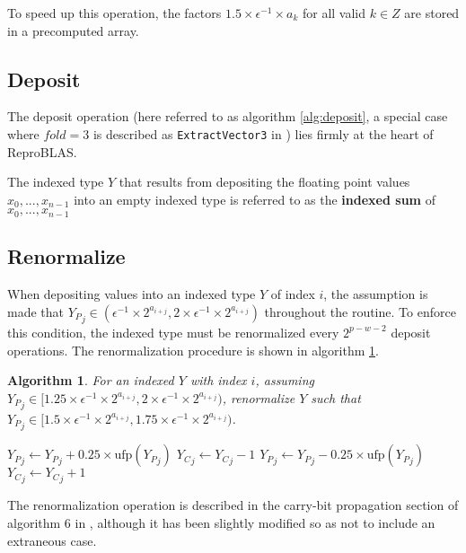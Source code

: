 \documentclass[12pt]{article}
\providecommand{\ufp}{\ensuremath{\text{ufp}}}
\theoremstyle{plain}
\newtheorem{alg}{Algorithm}[section]
\begin{document}
    To speed up this operation, the factors $1.5 \times \epsilon^{-1} \times a_k$ for all valid $k \in Z$ are stored in a precomputed array.

  \subsection{Deposit}
    The deposit operation (here referred to as algorithm \ref{alg:deposit}, a special case where $fold = 3$ is described as \verb|ExtractVector3| in \cite{repsum}) lies firmly at the heart of ReproBLAS.

    The indexed type $Y$ that results from depositing the floating point values $x_0, ..., x_{n - 1}$ into an empty indexed type is referred to as the \textbf{indexed sum} of $x_0, ..., x_{n - 1}$

  \subsection{Renormalize}
    When depositing values into an indexed type $Y$ of index $i$, the assumption is made that ${Y_P}_j \in (\epsilon^{-1}\times 2^{a_{i + j}}, 2 \times \epsilon^{-1}\times 2^{a_{i + j}})$ throughout the routine. To enforce this condition, the indexed type must be renormalized every $2^{p - w - 2}$ deposit operations. The renormalization procedure is shown in algorithm \ref{alg:renorm}.
    \begin{alg}
      For an indexed $Y$ with index $i$, assuming ${Y_P}_j \in [1.25 \times \epsilon^{-1}\times 2^{a_{i + j}}, 2 \times \epsilon^{-1}\times 2^{a_{i + j}})$, renormalize $Y$ such that ${Y_P}_j \in [1.5 \times \epsilon^{-1}\times 2^{a_{i + j}}, 1.75 \times \epsilon^{-1}\times 2^{a_{i + j}})$.
      \begin{algorithmic}
            \If{${Y_P}_j < 1.5 \times \ufp({Y_P}_j)$}
              \State ${Y_P}_j \gets {Y_P}_j + 0.25 \times \ufp({Y_P}_j)$
              \State ${Y_C}_j \gets {Y_C}_j - 1$
            \EndIf
            \If{${Y_P}_j \geq 1.75 \times \ufp({Y_P}_j)$}
              \State ${Y_P}_j \gets {Y_P}_j - 0.25 \times \ufp({Y_P}_j)$
              \State ${Y_C}_j \gets {Y_C}_j + 1$
            \EndIf
          \EndFor
        \EndFunction
      \end{algorithmic}
      \label{alg:renorm}
    \end{alg}
    The renormalization operation is described in the carry-bit propagation section of algorithm $6$ in \cite{repsum}, although it has been slightly modified so as not to include an extraneous case.
\end{document}
